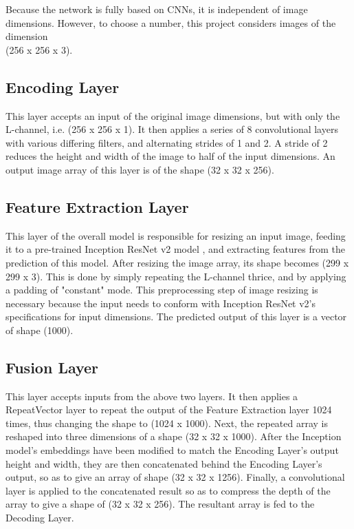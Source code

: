 \documentclass[10pt,twocolumn,letterpaper]{article}
\begin{document}
Because the network is fully based on CNNs, it is independent of image dimensions. However, to choose a number, this project considers images of the dimension\\(256 x 256 x 3).

\subsection{Encoding Layer}
This layer accepts an input of the original image dimensions, but with only the L-channel, i.e. (256 x 256 x 1). It then applies a series of 8 convolutional layers with various differing filters, and alternating strides of 1 and 2. A stride of 2 reduces the height and width of the image to half of the input dimensions. An output image array of this layer is of the shape (32 x 32 x 256).

\subsection{Feature Extraction Layer}
This layer of the overall model is responsible for resizing an input image, feeding it to a pre-trained Inception ResNet v2 model \cite{Inception}, and extracting features from the prediction of this model. After resizing the image array, its shape becomes (299 x 299 x 3). This is done by simply repeating the L-channel thrice, and by applying a padding of "constant" mode. This preprocessing step of image resizing is necessary because the input needs to conform with Inception ResNet v2's specifications for input dimensions. The predicted output of this layer is a vector of shape (1000).

\subsection{Fusion Layer}
This layer accepts inputs from the above two layers. It then applies a RepeatVector layer \cite{Keras} to repeat the output of the Feature Extraction layer 1024 times, thus changing the shape to (1024 x 1000). Next, the repeated array is reshaped into three dimensions of a shape (32 x 32 x 1000). After the Inception model's embeddings have been modified to match the Encoding Layer's output height and width, they are then concatenated behind the Encoding Layer's output, so as to give an array of shape (32 x 32 x 1256). Finally, a convolutional layer is applied to the concatenated result so as to compress the depth of the array to give a shape of (32 x 32 x 256). The resultant array is fed to the Decoding Layer.
\end{document}
